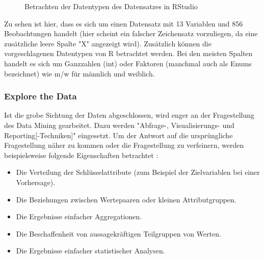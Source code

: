 \begin{figure}[H]
\centering
{}
\caption{Betrachten der Datentypen des Datensatzes in RStudio}
\label{fig:Lasagne_RStudio}
\end{figure}
Zu sehen ist hier, dass es sich um einen Datensatz mit 13 Variablen und 856 Beobachtungen handelt (hier scheint ein falscher Zeichensatz vorzuliegen, da eine zusätzliche leere Spalte "X" angezeigt wird). Zusätzlich können die vorgeschlagenen Datentypen von R betrachtet werden. Bei den meisten Spalten handelt es sich um Ganzzahlen (int) oder Faktoren (manchmal auch als Enums bezeichnet) wie m/w für männlich und weiblich.

\subsubsection{Explore the Data}
Ist die grobe Sichtung der Daten abgeschlossen, wird enger an der Fragestellung des Data Mining gearbeitet. Dazu werden "Abfrage-, Visualisierungs- und Reporting[-Techniken]"\citep[S.~16; eigene Übersetzung]{shearer_crisp-dm_2000} eingesetzt. Um der Antwort auf die ursprüngliche Fragestellung näher zu kommen oder die Fragestellung zu verfeinern, werden beispielsweise folgende Eigenschaften betrachtet \citep[S.~18; eigene Übersetzung]{chapman_crisp-dm_2000}:
\begin{itemize}
\item Die Verteilung der Schlüsselattribute (zum Beispiel der Zielvariablen bei einer Vorhersage).
\item Die Beziehungen zwischen Wertepaaren oder kleinen Attributgruppen.
\item Die Ergebnisse einfacher Aggregationen.
\item Die Beschaffenheit von aussagekräftigen Teilgruppen von Werten.
\item Die Ergebnisse einfacher statistischer Analysen.
\end{itemize}

